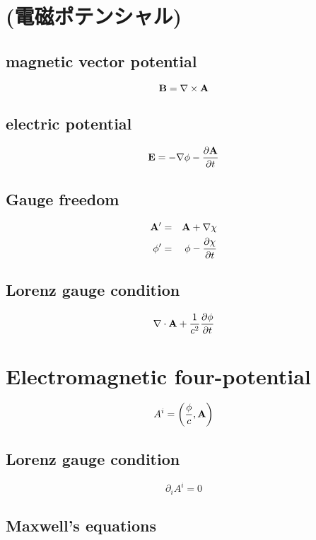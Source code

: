 \section{(電磁ポテンシャル)}
\subsection{magnetic vector potential}
\[ {\bf B} = \nabla \times {\bf A} \]

\subsection{electric potential}
\[ {\bf E} = -\nabla \phi -\frac{ \partial {\bf A} }{ \partial t } \]

\subsection{Gauge freedom}
\begin{eqnarray*}
{\bf A'}& =   & {\bf A} + \nabla \chi  \\
\phi '& =   & \phi - \frac{ \partial \chi }{ \partial t } \\
\end{eqnarray*}

\subsection{Lorenz gauge condition}
\[ \nabla \cdot {\bf A} +\frac{ 1 }{ c^2 } \frac{ \partial \phi }{ \partial t } \]

\section{Electromagnetic four-potential}
\[ A^i = \left( \frac{ \phi }{ c } , {\bf A} \right) \]

\subsection{Lorenz gauge condition}
\[ \partial_i A^i = 0 \]

\subsection{Maxwell's equations}
\[  \]
